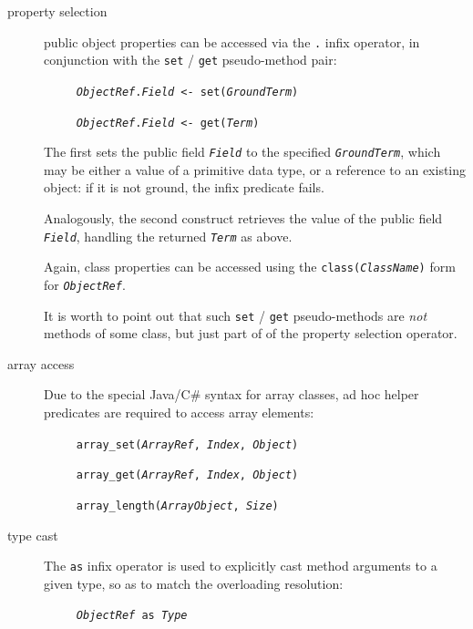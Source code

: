 \begin{description}
  \item [property selection]
        public object properties can be accessed via the \texttt{.} infix operator, in conjunction with the \texttt{set} / \texttt{get} pseudo-method pair:

        \texttt{~~~~~\textit{ObjectRef}.\textit{Field} <- set(\textit{GroundTerm})}

        \texttt{~~~~~\textit{ObjectRef}.\textit{Field} <- get(\textit{Term})}

        The first sets the public field \texttt{\textit{Field}} to the specified \texttt{\textit{GroundTerm}}, which may be either a value of a primitive data type, or a reference to an existing object: if it is not ground, the infix predicate fails.

        Analogously, the second construct retrieves the value of the public field
        \texttt{\textit{Field}}, handling the returned \texttt{\textit{Term}} as above.

        Again, class properties can be accessed using the  \texttt{class(\textit{ClassName})} form for  \texttt{\textit{ObjectRef}}.

        It is worth to point out that such \texttt{set} / \texttt{get}
        pseudo-methods are \textit{not} methods of some class, but just
        part of of the property selection operator.

  \item [array access]
        Due to the special Java/C\# syntax for array classes, ad hoc helper predicates are required to access array elements:

        \texttt{~~~~~array\_set(\textit{ArrayRef}, \textit{Index}, \textit{Object})}

        \texttt{~~~~~array\_get(\textit{ArrayRef}, \textit{Index}, \textit{Object})}



        \texttt{~~~~~array\_length(\textit{ArrayObject}, \textit{Size})}

  \item [type cast]
        The \texttt{as} infix operator is used to explicitly cast method arguments to a given type, so as to match the overloading resolution:

        \texttt{~~~~~\textit{ObjectRef} as \textit{Type}}


\end{description}
